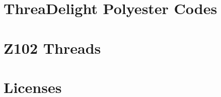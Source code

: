 \documentclass[10pt]{report}
\begin{document}




\section{ThreaDelight Polyester Codes}

\section{Z102 Threads}



\section{Licenses}



\printindex
\end{document}
